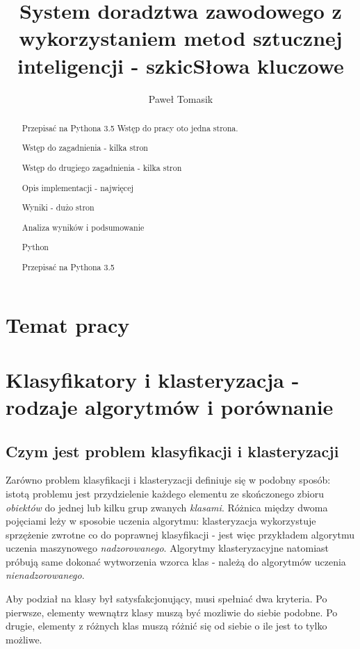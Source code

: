 \documentclass[12pt,a4paper,oneside]{report} %
\title{System doradztwa zawodowego z wykorzystaniem metod sztucznej inteligencji - szkic}
\author{Paweł Tomasik}
\begin{document}
\maketitle
\begin{abstract}
Przepisać na Pythona 3.5
Wstęp do pracy oto jedna strona.\par
Wstęp do zagadnienia - kilka stron \par
Wstęp do drugiego zagadnienia - kilka stron \par
Opis implementacji - najwięcej \par
Wyniki - dużo stron\par
Analiza wyników i podsumowanie \par
\title{Słowa kluczowe}
Python
\end{abstract}
\renewcommand{\abstractname}{Strzeszczenie}
\begin{abstract}
Przepisać na Pythona 3.5
\end{abstract}

\tableofcontents

\chapter{Temat pracy}

\chapter{Klasyfikatory i klasteryzacja - rodzaje algorytmów i porównanie}
\section{Czym jest problem klasyfikacji i klasteryzacji}

Zarówno problem klasyfikacji i klasteryzacji definiuje się w podobny sposób: istotą problemu jest przydzielenie każdego elementu ze skończonego zbioru \emph{obiektów} do jednej lub kilku grup zwanych \emph{klasami}. Różnica między dwoma pojęciami leży w sposobie uczenia algorytmu: klasteryzacja wykorzystuje sprzężenie zwrotne co do poprawnej klasyfikacji - jest więc przykładem algorytmu uczenia maszynowego \emph{nadzorowanego}. Algorytmy klasteryzacyjne natomiast próbują same dokonać wytworzenia wzorca klas - należą do algorytmów uczenia \emph{nienadzorowanego}.\par

Aby podział na klasy był satysfakcjonujący, musi spełniać dwa kryteria. Po pierwsze, elementy wewnątrz klasy muszą być mozliwie do siebie podobne. Po drugie, elementy z różnych klas muszą różnić się od siebie o ile jest to tylko możliwe.\par
\end{document}
